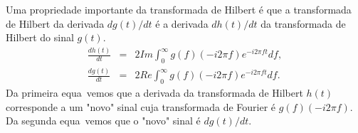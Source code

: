 Uma propriedade importante da transformada de Hilbert \'e que a
transformada de Hilbert da derivada $dg(t)/dt$ \'e a derivada
$dh(t)/dt$ da transformada de Hilbert do sinal $g(t)$.
\begin{eqnarray}
\frac{dh(t)}{dt} &=& 2Im\int_{0}^{\infty}g(f)(-i2\pi f)e^{-i2\pi
ft}df, \\
\frac{dg(t)}{dt} &=& 2Re\int_{0}^{\infty}g(f)(-i2\pi f)e^{-i2\pi
ft}df.
\end{eqnarray}
Da primeira equa\cao\ vemos que a derivada da transformada de
Hilbert $h(t)$ corresponde a um "novo" sinal cuja transformada de
Fourier \'e $g(f)(-i2\pi f)$. Da segunda equa\cao\ vemos que o
"novo" sinal \'e $dg(t)/dt$.



